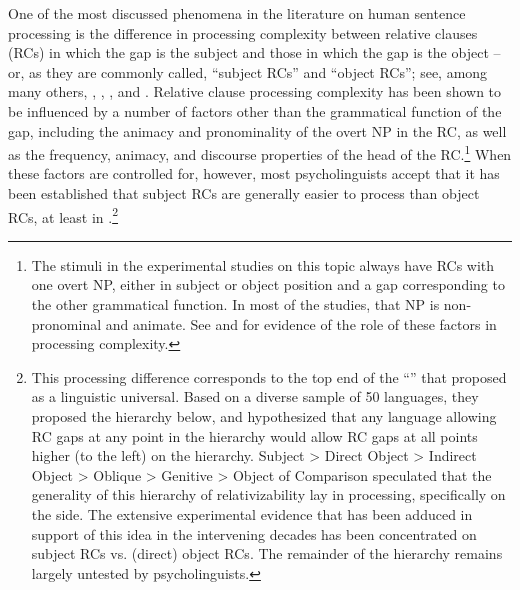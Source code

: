\documentclass[output=paper,biblatex,babelshorthands,newtxmath,draftmode,colorlinks,citecolor=brown]{langscibook}
\begin{document}
One of the most discussed phenomena in the literature on human sentence processing is the difference
in processing complexity between relative clauses (RCs) in which the gap is the subject and those in which the gap is the object -- or, as they are commonly called, ``subject RCs'' and ``object RCs''; see, among many others, \citet{WannerMaratsos78}, \citet{Gibson98a}, \citet{TraxlerEtal2002}, and \citet{GennariMacDonald2008}.  Relative clause processing complexity has been shown to be influenced by a number of factors other than the grammatical function of the gap, including the animacy and pronominality of the overt NP in the RC, as well as the frequency, animacy, and discourse properties of the head of the RC.\footnote{The stimuli in the experimental studies on this topic always have RCs with one overt NP, either in subject or object position and a gap corresponding to the other grammatical function. In most of the studies, that NP is non-pronominal and animate.  See \citet{RealiChristiansen07} and \citet{RolandEtal2012} for evidence of the role of these factors in processing complexity.} When these factors are controlled for, however, most psycholinguists accept that it has been established that subject RCs are generally easier to process than object RCs, at least in .\footnote{This processing difference corresponds to the top end of the ``'' that \citet{KC77a} proposed as a linguistic universal. Based on a diverse sample of 50 languages, they proposed the hierarchy below, and hypothesized that any language allowing RC gaps at any point in the hierarchy would allow RC gaps at all points higher (to the left) on the hierarchy.
\ea
Subject 
> 
Direct Object 
> 
Indirect Object 
> 
Oblique 
> 
Genitive
> 
Object of Comparison
\z
\citeauthor{KC77a} speculated that the generality of this hierarchy of relativizability lay in processing, specifically on the  side.  The extensive experimental evidence that has been adduced in support of this idea in the intervening decades has been concentrated on subject RCs vs. (direct) object RCs.  The remainder of the hierarchy remains largely untested by psycholinguists.}
\end{document}
